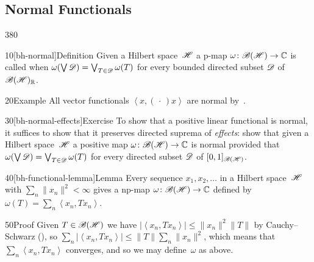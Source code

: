 \subsection{Normal Functionals}
\begin{parsec}{380}%
\begin{point}{10}[bh-normal]{Definition}%
Given a Hilbert space~$\mathscr{H}$
a p-map $\omega\colon \mathscr{B}(\mathscr{H})\to\mathbb{C}$
is called %
when
$\omega(\bigvee \mathscr{D})=\bigvee_{T\in\mathscr{D}} \omega(T)$
for every bounded directed subset $\mathscr{D}$ of~$\mathscr{B}(\mathscr{H})_{\mathbb{R}}$.
\end{point}
\begin{point}{20}{Example}%
All vector functionals%
$\left<x,(\,\cdot\,)x\right>$ are normal by~.
\end{point}
\begin{point}{30}[bh-normal-effects]{Exercise}%
To show that a positive linear functional is normal, it suffices to show 
that it preserves directed suprema of \emph{effects}: 
show that given a Hilbert space~$\mathscr{H}$
a  positive map $\omega\colon \mathscr{B}(\mathscr{H})\to\mathbb{C}$
is normal 
provided that $\omega(\bigvee \mathscr{D}) = \bigvee_{T\in\mathscr{D}} \omega(T)$
for every directed subset $\mathscr{D}$ of $[0,1]_{\mathscr{B}(\mathscr{H})}$.
\end{point}
\begin{point}{40}[bh-functional-lemma]{Lemma}%
Every sequence $x_1,x_2,\dotsc $ in a Hilbert space~$\mathscr{H}$
with $\sum_n \|x_n\|^2 < \infty$
gives a np-map $\omega\colon\mathscr{B}(\mathscr{H})\to\mathbb{C}$
defined by~$\omega(T)=\sum_n \left<x_n,Tx_n\right>$.
\begin{point}{50}{Proof}%
Given $T\in\mathscr{B}(\mathscr{H})$ 
we have $\left|\left<x_n,Tx_n\right>\right|\leq \|x_n\|^2\|T\|$ 
by Cauchy--Schwarz (),
so $\sum_n \left|\left<x_n,Tx_n\right>\right|
\leq \|T\| \sum_n \|x_n\|^2$,
which means that~$\sum_n \left<x_n,Tx_n\right>$
converges, 
and so we may define~$\omega$ as above.


\end{point}
\end{point}
\end{parsec}
